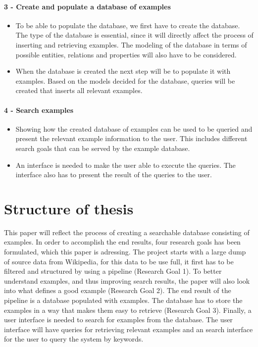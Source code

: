 \paragraph{3 - Create and populate a database of examples}
\begin{itemize}
    \item To be able to populate the database, we first have to create the database. The type of the database is essential, since it will directly affect the process of inserting and retrieving examples. The modeling of the database in terms of possible entities, relations and properties will also have to be considered.
    \item When the database is created the next step will be to populate it with examples. Based on the models decided for the database, queries will be created that inserts all relevant examples.
\end{itemize}


\paragraph{4 - Search examples }
\begin{itemize}
    \item Showing how the created database of examples can be used to be queried and present the relevant example information to the user. This includes different search goals that can be served by the example database.
    \item An interface is needed to make the user able to execute the queries. The interface also has to present the result of the queries to the user.
\end{itemize}


\section{Structure of thesis}
This paper will reflect the process of creating a searchable database consisting of examples. In order to accomplish the end results, four research goals has been formulated, which this paper is adressing. The project starts with a large dump of source data from Wikipedia, for this data to be use full, it first has to be filtered and structured by using a pipeline (Research Goal 1). To better understand examples, and thus improving search results, the paper will also look into what defines a good example (Research Goal 2). The end result of the pipeline is a database populated with examples. The database has to store the examples in a way that makes them easy to retrieve (Research Goal 3). Finally, a user interface is needed to search for examples from the database. The user interface will have queries for retrieving relevant examples and an search interface for the user to query the system by keywords. 

